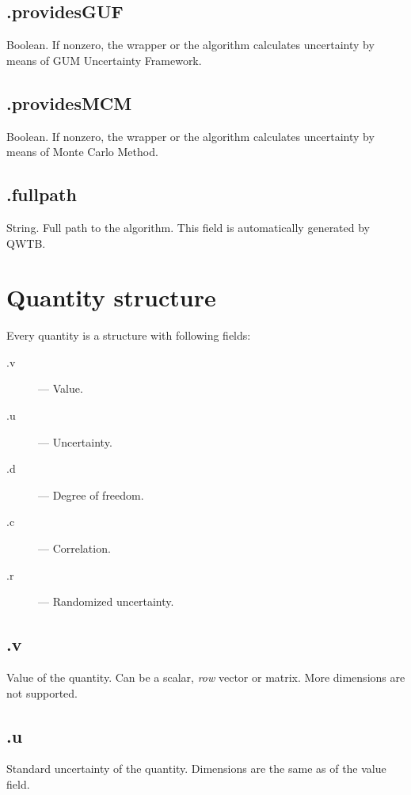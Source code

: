 \documentclass[12pt]{article} %
\begin{document}
\subsection{\textsf{.providesGUF}} %
Boolean. If nonzero, the wrapper or the algorithm calculates uncertainty by means of GUM Uncertainty
Framework.

\subsection{\textsf{.providesMCM}} %
Boolean. If nonzero, the wrapper or the algorithm calculates uncertainty by means of Monte Carlo
Method.

\subsection{\textsf{.fullpath}} %
String. Full path to the algorithm. This field is automatically generated by QWTB.

\section{Quantity structure} %
\label{structquantity}
Every quantity is a structure with following fields:
\begin{description}
        \item [\textsf{.v}] --- Value.
        \item [\textsf{.u}] --- Uncertainty.
        \item [\textsf{.d}] --- Degree of freedom.
        \item [\textsf{.c}] --- Correlation.
        \item [\textsf{.r}] --- Randomized uncertainty.
\end{description}

\subsection{\textsf{.v}} %
Value of the quantity. Can be a scalar, \emph{row} vector or matrix. More dimensions are not supported.

\subsection{\textsf{.u}} %
Standard uncertainty of the quantity. Dimensions are the same as of the value field. 
\end{document}
